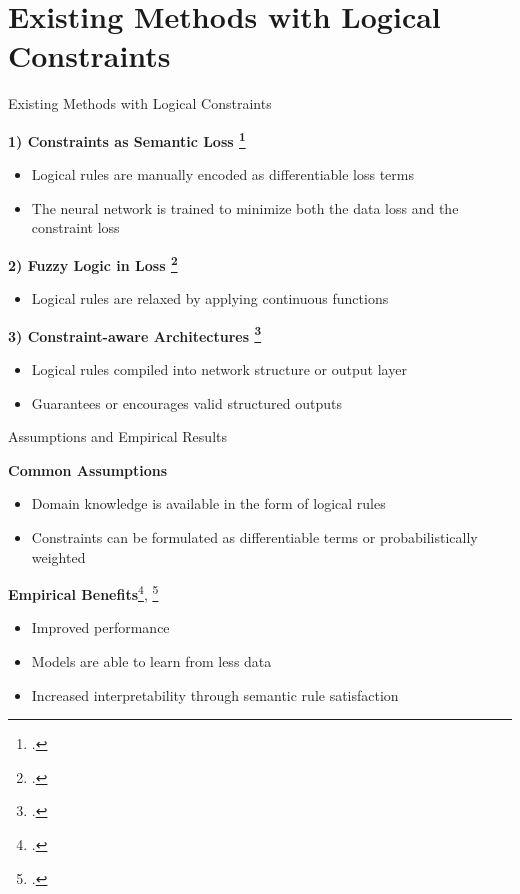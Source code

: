 \documentclass[aspectratio=169]{beamer}
\begin{document}
\section{Existing Methods with Logical Constraints}

\begin{frame}{Existing Methods with Logical Constraints}
    
    \textbf{1) Constraints as Semantic Loss \footcite{xu2018semanticlossfunctiondeep}}
    \begin{itemize}
      \item Logical rules are manually encoded as differentiable loss terms
      \item The neural network is trained to minimize both the data loss and the constraint loss
    \end{itemize}

    \textbf{2) Fuzzy Logic in Loss \footcite{Badreddine_2022}}
    \begin{itemize}
      \item Logical rules are relaxed by applying continuous functions
    \end{itemize}
    
    \textbf{3) Constraint-aware Architectures \footcite{yang2023injectinglogicalconstraintsneural}}
    \begin{itemize}
      \item Logical rules compiled into network structure or output layer
      \item Guarantees or encourages valid structured outputs
    \end{itemize}
    
\end{frame}

\begin{frame}{Assumptions and Empirical Results}

    \textbf{Common Assumptions}
    \begin{itemize}
      \item Domain knowledge is available in the form of logical rules
      \item Constraints can be formulated as differentiable terms or probabilistically weighted
    \end{itemize}
    
    \textbf{Empirical Benefits}\footcite{Giunchiglia_2022}, 
    \footcite{stoian2024realisticsyntheticdataconstraining} 
    \begin{itemize}
      \item Improved performance
      \item Models are able to learn from less data 
      \item Increased interpretability through semantic rule satisfaction
    \end{itemize}

\end{frame}
\end{document}
